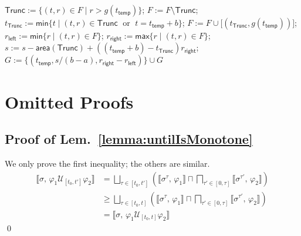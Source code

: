 \documentclass[envcountsect,orivec]{llncs} \usepackage{etex} \usepackage[]{graphicx}
\def\myqed{\qed}
\newcommand{\UntilOp}[1]{\mathbin{\mathcal{U}_{#1}}}
\newcommand{\Robust}[2]{{ \llbracket #1,\, #2 \rrbracket}}
\newcommand{\Vee}[1]{{{\bigsqcup_{#1}}}}
\newcommand{\Wedge}[1]{{{\bigsqcap_{#1}}}}
\newcommand{\Max}{\mathsf{max}}
\newcommand{\Min}{\mathsf{min}}
\begin{document}
\begin{algorithm}
\begin{algorithmic}
    \State $\mathsf{Trunc} := \{(t, r) \in F \mid r > g(t_{\mathsf{temp}})\}$; 
    \State $F := F \setminus \mathsf{Trunc}$;
    \State $t_{\mathsf{Trunc}} := \mathsf{min} \{t \mid(t,r) \in \mathsf{Trunc} \; \text{ or } \; t = t_{\mathsf{temp}} + b\}$;
    \State $F := F \cup \big[ (t_{\mathsf{Trunc}}, g(t_{\mathsf{temp}}))\big]$;
    \State $r_{\mathsf{left}} := \Min \{ r \mid (t,r) \in F \}$;
    \State $r_{\mathsf{right}} := \Max \{ r \mid (t,r) \in F \}$;
    \State $s := s
    - \mathsf{area}(\mathsf{Trunc}) 
    + ((t_{\mathsf{temp}} + b) - t_{\mathsf{Trunc}})r_{\mathsf{right}}$;
\State $G := \{(t_{\mathsf{temp}}, s/(b-a),r_{\mathsf{right}} - r_{\mathsf{left}})\} \cup G$
\EndWhile
  \end{algorithmic}
\end{algorithm}





\section{Omitted Proofs}
\subsection{Proof of Lem.~\ref{lemma:untilIsMonotone}}
\begin{myproof}
  We only prove the first inequality; the others are similar.
\[
    \begin{array}{ll}
      \Robust{\sigma}{\varphi_1 \UntilOp{[t_0,t']} \varphi_2} 
      &= \Vee{\tau \in [t_0, t']}(\Robust{\sigma^{\tau}}{\varphi_1} \sqcap \Wedge{\tau' \in [0, \tau]} \Robust{\sigma^{\tau'}}{\varphi_2})\\
        & \geq \Vee{\tau \in [t_0, t]}(\Robust{\sigma^{\tau}}{\varphi_1} \sqcap \Wedge{\tau' \in [0, \tau]} \Robust{\sigma^{\tau'}}{\varphi_2})\\
            & = \Robust{\sigma}{\varphi_1 \UntilOp{[t_0,t]} \varphi_2} 
    \end{array}
  \]
  \myqed
\end{myproof}
\end{document}
